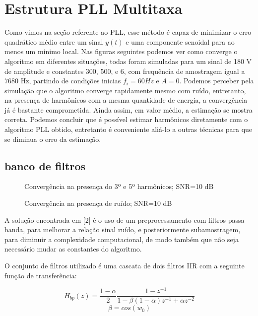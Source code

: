 \documentclass[a4paper, 12pt]{book}
\begin{document}
	
\section{Estrutura PLL Multitaxa}
	
Como vimos na seção referente ao PLL, esse método é capaz de minimizar o erro quadrático médio entre um sinal $y(t)$ e uma componente senoidal para ao menos um mínimo local. Nas figuras seguintes podemos ver como converge o algoritmo em diferentes situações, todas foram simuladas para um sinal de 180 V de amplitude e constantes 300, 500, e 6, com frequência de amostragem igual a 7680 Hz, partindo de condições inicias $f_i=60 Hz$ e $A=0$. Podemos perceber pela simulação que o algoritmo converge rapidamente mesmo com ruído, entretanto, na presença de harmônicos com a mesma quantidade de energia, a convergência já é bastante comprometida. Ainda assim, em valor médio, a estimação se mostra correta. Podemos concluir que é possível estimar harmônicos diretamente com o algoritmo PLL obtido, entretanto é conveniente aliá-lo a outras técnicas para que se diminua o erro da estimação.

\subsection{banco de filtros}

\begin{figure}[h]
	\centering    
	\def\svgwidth{\columnwidth}
	
	\caption{Convergência na presença do 3º e 5º harmônicos; SNR=10 dB}
	\label{fig:your image label}
\end{figure}

\begin{figure}[h]
	\centering    
	\def\svgwidth{\columnwidth}
	
	\caption{Convergência na presença de ruído; SNR=10 dB}
	\label{fig:your image label}
\end{figure}

\indent A solução encontrada em [2] é o uso de um preprocessamento com filtros passa-banda, para melhorar a relação sinal ruído, e posteriormente subamostragem, para diminuir a complexidade computacional, de modo também que não seja necessário mudar as constantes do algoritmo.

\indent O conjunto de filtros utilizado é uma cascata de dois filtros IIR com a seguinte função de transferência:

\begin{equation}
H_{bp}(z)=\frac{1-\alpha}{2}\frac{1-z^{-1}}{1-\beta (1-\alpha) z^{-1} + \alpha z^{-2}}
\end{equation}
\begin{equation}
\beta=cos(w_0)
\label{eq:w0 filtro}
\end{equation}
\end{document}
